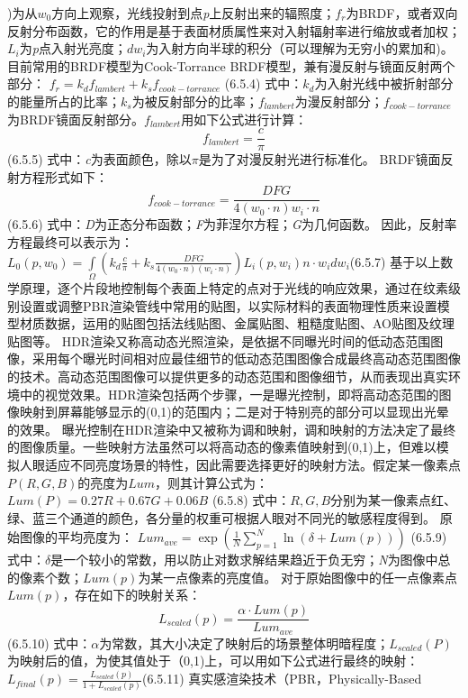 \right)\)为从\(w_0\)方向上观察，光线投射到点\emph{p}上反射出来的辐照度；\(f_r\)为BRDF，或者双向反射分布函数，它的作用是基于表面材质属性来对入射辐射率进行缩放或者加权；\(L_i\)为\emph{p}点入射光亮度；\(dw_i\)为入射方向半球的积分（可以理解为无穷小的累加和)。目前常用的BRDF模型为Cook-Torrance BRDF模型，兼有漫反射与镜面反射两个部分： \({f_r} = {k_d}{f_{lambert}} + {k_s}{f_{cook - torrance}}\) (6.5.4) 式中：\(k_d\)为入射光线中被折射部分的能量所占的比率；\(k_s\)为被反射部分的比率；\(f_{lambert}\)为漫反射部分；\(f_{cook-torrance}\)为BRDF镜面反射部分。\(f_{lambert}\)用如下公式进行计算： \[f_{lambert}=\frac{c}{\pi}\] (6.5.5) 式中：\emph{c}为表面颜色，除以\(\pi\)是为了对漫反射光进行标准化。 BRDF镜面反射方程形式如下： \[f_{cook-torrance}=\frac{DFG}{4(w_0\cdot n){w_i \cdot n}}\] (6.5.6) 式中：\emph{D}为正态分布函数；\emph{F}为菲涅尔方程；\emph{G}为几何函数。 因此，反射率方程最终可以表示为： \({L_0}\left( {p,{w_0}} \right) = \int\limits_\Omega {\left( {{k_d}\frac{c}{\pi } + {k_s}\frac{{DFG}}{{4\left( {{w_0} \cdot n} \right)\left( {{w_i} \cdot n} \right)}}} \right){L_i}} \left( {p,{w_i}} \right)n \cdot {w_i}d{w_i}\)(6.5.7) 基于以上数学原理，逐个片段地控制每个表面上特定的点对于光线的响应效果，通过在纹素级别设置或调整PBR渲染管线中常用的贴图，以实际材料的表面物理性质来设置模型材质数据，运用的贴图包括法线贴图、金属贴图、粗糙度贴图、AO贴图及纹理贴图等。 HDR渲染又称高动态光照渲染，是依据不同曝光时间的低动态范围图像，采用每个曝光时间相对应最佳细节的低动态范围图像合成最终高动态范围图像的技术。高动态范围图像可以提供更多的动态范围和图像细节，从而表现出真实环境中的视觉效果。HDR渲染包括两个步骤，一是曝光控制，即将高动态范围的图像映射到屏幕能够显示的(0,1)的范围内；二是对于特别亮的部分可以显现出光晕的效果。 曝光控制在HDR渲染中又被称为调和映射，调和映射的方法决定了最终的图像质量。一些映射方法虽然可以将高动态的像素值映射到(0,1)上，但难以模拟人眼适应不同亮度场景的特性，因此需要选择更好的映射方法。假定某一像素点\(P(R,G,B)\)的亮度为\(Lum\)，则其计算公式为： \(Lum\left( P \right) = 0.27R + 0.67G + 0.06B\) (6.5.8) 式中：\(R,G,B\)分别为某一像素点红、绿、蓝三个通道的颜色，各分量的权重可根据人眼对不同光的敏感程度得到。 原始图像的平均亮度为： \(Lu{m_{ave}} = \exp \left( {\frac{1}{N}\sum\limits_{p = 1}^N {\ln \left( {\delta + Lum\left( p \right)} \right)} } \right)\) (6.5.9) 式中：\(\delta\)是一个较小的常数，用以防止对数求解结果趋近于负无穷；\emph{N}为图像中总的像素个数；\(Lum(p)\)为某一点像素的亮度值。 对于原始图像中的任一点像素点\(Lum(p)\)，存在如下的映射关系： \[{L_{scaled}}\left( p \right) = \frac{{\alpha \cdot Lum\left( p \right)}}{{Lu{m_{ave}}}}\](6.5.10) 式中：\(\alpha\)为常数，其大小决定了映射后的场景整体明暗程度；\(L_{scaled}(P)\)为映射后的值，为使其值处于（0,1)上，可以用如下公式进行最终的映射： \({L_{final}}\left( p \right) = \frac{{{L_{scaled}}\left( p \right)}}{{1 + {L_{scaled}}\left( p \right)}}\)(6.5.11) 真实感渲染技术（PBR，Physically-Based 